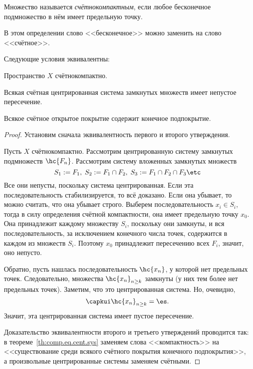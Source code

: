 \documentclass[a4paper]{article}
\begin{document}
\begin{df}
Множество называется \emph{счётно\д компактным}, если любое бесконечное подмножество в нём
имеет предельную точку.
\end{df}

\begin{note}
В этом определении слово <<бесконечное>> можно заменить на слово <<счётное>>.
\end{note}

\begin{stm}
Следующие условия эквивалентны:
\begin{items}{-3}
\item Пространство $X$ счётно\д компактно.
\item Всякая счётная центрированная система замкнутых множеств имеет непустое пересечение.
\item Всякое счётное открытое покрытие содержит конечное подпокрытие.
\end{items}
\end{stm}
\begin{proof}
Установим сначала эквивалентность первого и второго утверждения.

Пусть $X$ счётно\д компактно. Рассмотрим центрированную систему замкнутых подмножеств $\hc{F_n}$.
Рассмотрим систему вложенных замкнутых множеств
$$S_1 := F_1,\; S_2 := F_1 \cap F_2,\; S_3 := F_1\cap F_2\cap F_3\etc$$
Все они непусты, поскольку система центрированная. Если эта последовательность стабилизируется,
то всё доказано. Если она убывает, то можно считать, что она убывает строго.
Выберем последовательность $x_i \in S_i$, тогда в силу определения счётной компактности,
она имеет предельную точку $x_0$. Она принадлежит каждому множеству $S_i$, поскольку они замкнуты,
и вся последовательность, за исключением конечного числа точек, содержится в каждом из множеств $S_i$.
Поэтому $x_0$ принадлежит пересечению всех $F_i$, значит, оно непусто.

Обратно, пусть нашлась последовательность $\hc{x_n}$, у которой нет предельных точек.
Следовательно, множества $\hc{x_n}_{n \ge k}$ замкнуты (у них тем более нет предельных
точек). Заметим, что это центрированная система.
Но, очевидно,
$$\capkui \hc{x_n}_{n \ge k} = \es.$$
Значит, эта центрированная система имеет пустое пересечение.

Доказательство эквивалентности второго и третьего утверждений проводится так:
в теореме~\ref{th:comp.eq.cent.sys} заменяем слова <<компактность>> на
<<существование среди всякого счётного покрытия конечного подпокрытия>>,
а произвольные центрированные системы заменяем счётными.
\end{proof}
\end{document}
